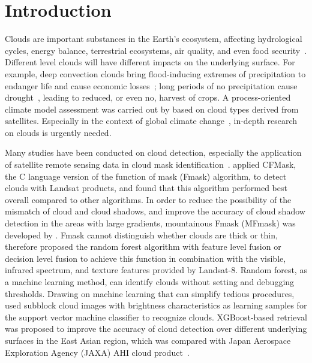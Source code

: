 \documentclass[review]{elsarticle}
\begin{document}
\section{Introduction}
\label{section:introduction}
Clouds are important substances in the Earth's ecosystem, affecting hydrological cycles, energy balance, terrestrial ecosystems, air quality, and even food security~\citep{Narenpitak2016MS000872, Watanabe2018, Buhl2019, Eytan2020, Goldblatt2021, Cesana2021, Hieronymus2021MS002849}.
Different level clouds will have different impacts on the underlying surface.
For example, deep convection clouds bring flood-inducing extremes of precipitation to endanger life and cause economic losses~\citep{Furtado2017JD028192}; long periods of no precipitation cause drought~\citep{Hartick2022GL100924}, leading to reduced, or even no, harvest of crops.
A process-oriented climate model assessment was carried out by \citet{Kaps202361} based on cloud types derived from satellites.
Especially in the context of global climate change~\citep{Jrgensen2022, Zhang2023}, in-depth research on clouds is urgently needed.

Many studies have been conducted on cloud detection, especially the application of satellite remote sensing data in cloud mask identification~\citep{LI2007311, Shang2016JD025659, SKAKUN2022112990, QIU2019111205, SUN201770, LI2019196, SEDANO2011588, POULSEN2020111999, JOSHI2019101898}.
\citet{FOGA2017379} applied CFMask, the C language version of the function of mask (Fmask) algorithm, to detect clouds with Landsat products, and found that this algorithm performed best overall compared to other algorithms.
In order to reduce the possibility of the mismatch of cloud and cloud shadows, and improve the accuracy of cloud shadow detection in the areas with large gradients, mountainous Fmask (MFmask) was developed by \citet{QIU2017107}.
Fmask cannot distinguish whether clouds are thick or thin, therefore \citet{GHASEMIAN2018288} proposed the random forest algorithm with feature level fusion or decision level fusion to achieve this function in combination with the visible, infrared spectrum, and texture features provided by Landsat-8.
Random forest, as a machine learning method, can identify clouds without setting and debugging thresholds.
Drawing on machine learning that can simplify tedious procedures, \citet{LI201534} used subblock cloud images with brightness characteristics as learning samples for the support vector machine classifier to recognize clouds.
XGBoost-based retrieval was proposed to improve the accuracy of cloud detection over different underlying surfaces in the East Asian region, which was compared with Japan Aerospace Exploration Agency (JAXA) AHI cloud product~\citep{YANG2022112971}.
\end{document}
